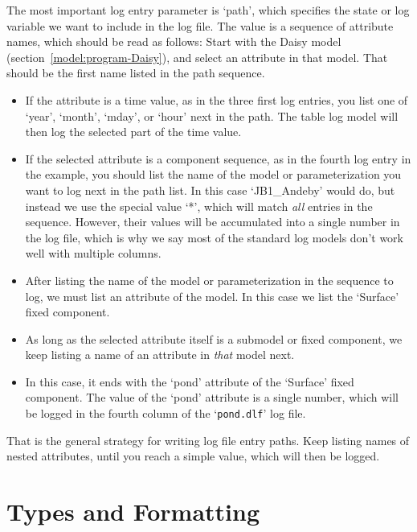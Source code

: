 The most important log entry parameter is `path', which specifies the
state or log variable we want to include in the log file.  The value
is a sequence of attribute names, which should be read as follows:
Start with the Daisy model (section~\ref{model:program-Daisy}), and
select an attribute in that model.  That should be the first name
listed in the path sequence.
\begin{itemize}
\item If the attribute is a time value, as in the three first log
  entries, you list one of `year', `month', `mday', or `hour' next in
  the path.  The table log model will then log the selected part of
  the time value.
\item If the selected attribute is a component sequence, as in the
  fourth log entry in the example, you should list the name of the
  model or parameterization you want to log next in the path list.  In
  this case `JB1\_Andeby' would do, but instead we use the special
  value `*', which will match \emph{all} entries in the sequence.
  However, their values will be accumulated into a single number in
  the log file, which is why we say most of the standard log models
  don't work well with multiple columns.
\item After listing the name of the model or parameterization in the
  sequence to log, we must list an attribute of the model.  In this
  case we list the `Surface' fixed component.
\item As long as the selected attribute itself is a submodel or fixed
  component, we keep listing a name of an attribute in \emph{that}
  model next.
\item In this case, it ends with the `pond' attribute of the `Surface'
  fixed component.  The value of the `pond' attribute is a single
  number, which will be logged in the fourth column of the
  `\texttt{pond.dlf}' log file.
\end{itemize}
That is the general strategy for writing log file entry paths.  Keep
listing names of nested attributes, until you reach a simple value,
which will then be logged.

\section{Types and Formatting}
\label{sec:types}

